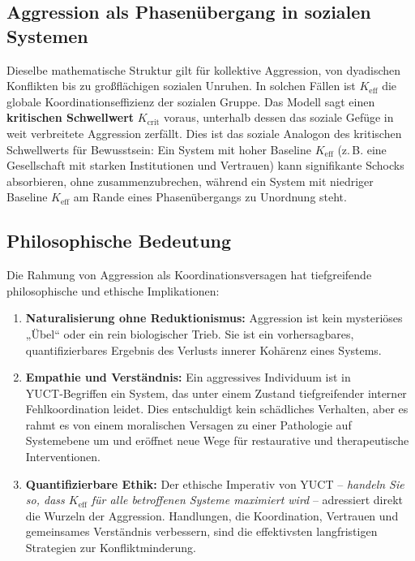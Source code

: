 \documentclass[12pt,a4paper]{article}
\begin{document}
	\subsection{Aggression als Phasenübergang in sozialen Systemen}
	
	Dieselbe mathematische Struktur gilt für kollektive Aggression, von dyadischen Konflikten bis zu großflächigen sozialen Unruhen. In solchen Fällen ist \(K_{\mathrm{eff}}\) die globale Koordinationseffizienz der sozialen Gruppe. Das Modell sagt einen \textbf{kritischen Schwellwert} \(K_{\mathrm{crit}}\) voraus, unterhalb dessen das soziale Gefüge in weit verbreitete Aggression zerfällt. Dies ist das soziale Analogon des kritischen Schwellwerts für Bewusstsein: Ein System mit hoher Baseline \(K_{\mathrm{eff}}\) (z. B. eine Gesellschaft mit starken Institutionen und Vertrauen) kann signifikante Schocks absorbieren, ohne zusammenzubrechen, während ein System mit niedriger Baseline \(K_{\mathrm{eff}}\) am Rande eines Phasenübergangs zu Unordnung steht.
	
	\subsection{Philosophische Bedeutung}
	
	Die Rahmung von Aggression als Koordinationsversagen hat tiefgreifende philosophische und ethische Implikationen:
	
	\begin{enumerate}
		\item \textbf{Naturalisierung ohne Reduktionismus:} Aggression ist kein mysteriöses „Übel“ oder ein rein biologischer Trieb. Sie ist ein vorhersagbares, quantifizierbares Ergebnis des Verlusts innerer Kohärenz eines Systems.
		\item \textbf{Empathie und Verständnis:} Ein aggressives Individuum ist in YUCT‑Begriffen ein System, das unter einem Zustand tiefgreifender interner Fehlkoordination leidet. Dies entschuldigt kein schädliches Verhalten, aber es rahmt es von einem moralischen Versagen zu einer Pathologie auf Systemebene um und eröffnet neue Wege für restaurative und therapeutische Interventionen.
		\item \textbf{Quantifizierbare Ethik:} Der ethische Imperativ von YUCT – \textit{handeln Sie so, dass \(K_{\mathrm{eff}}\) für alle betroffenen Systeme maximiert wird} – adressiert direkt die Wurzeln der Aggression. Handlungen, die Koordination, Vertrauen und gemeinsames Verständnis verbessern, sind die effektivsten langfristigen Strategien zur Konfliktminderung.
	\end{enumerate}
	
\end{document}
